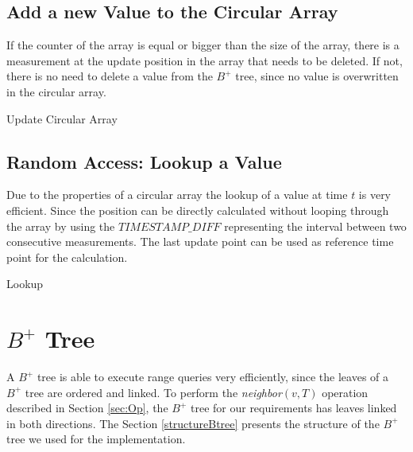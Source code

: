 \documentclass[abstracton,12pt]{scrreprt}
\begin{document}
\subsection{Add a new Value to the Circular Array}
If the counter of the array is equal or bigger than the size of the array, there is a measurement at the update position in the array that needs to be deleted. If not, there is no need to delete a value from the $B^+$ tree, since no value is overwritten in the circular array. 

\begin{algorithm}[ht!]
	
	\caption{Update Circular Array}
\end{algorithm}

\newpage

\subsection{Random Access: Lookup a Value}
Due to the properties of a circular array the lookup of a value at time $t$ is very efficient. Since the position can be directly calculated without looping through the array by using the $TIMESTAMP\_DIFF$ representing the interval between two consecutive measurements. The last update point can be used as reference time point for the calculation. 

\begin{algorithm}[ht!]
	
	\caption{Lookup}
\end{algorithm}

\newpage
\section{$B^+$ Tree}
\label{sec:BplusTree}
A $B^+$ tree is able to execute range queries very efficiently, since the leaves of a $B^+$ tree are ordered and linked. To perform the \emph{neighbor}$(v,T)$ operation described in Section \ref{sec:Op}, the $B^+$ tree for our requirements has leaves linked in both directions. The Section \ref{structureBtree} presents the structure of the $B^+$ tree we used for the implementation.
\end{document}
